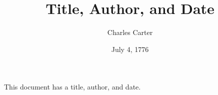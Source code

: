 \documentclass{article}
\title{Title, Author, and Date}
\author{Charles Carter}
\date{July 4, 1776}
\begin{document}
 
    \maketitle{}
    This document has a title, author, and date.
\end{document}

